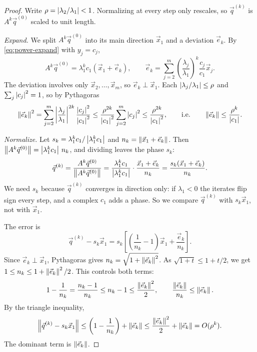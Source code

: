 \begin{proof}
  Write $\rho = \left\lvert \lambda_2/\lambda_1 \right\rvert < 1$. Normalizing at every step only rescales, so $\vec{q}^{(k)}$ is $A^k\vec{q}^{(0)}$ scaled to unit length.

  \emph{Expand.} We split $A^k\vec{q}^{(0)}$ into its main direction $\vec{x}_1$ and a deviation $\vec{e}_k$. By \eqref{eq:power-expand} with $y_j = c_j$,
  \begin{equation*}
    A^k\vec{q}^{(0)} = \lambda_1^kc_1(\vec{x}_1 + \vec{e}_k), \qquad \vec{e}_k = \sum_{j=2}^m\left(\frac{\lambda_j}{\lambda_1}\right)^k\frac{c_j}{c_1}\vec{x}_j.
  \end{equation*}
  The deviation involves only $\vec{x}_2, \dots, \vec{x}_m$, so $\vec{e}_k \perp \vec{x}_1$. Each $\left\lvert \lambda_j/\lambda_1 \right\rvert \le \rho$ and $\sum_j\left\lvert c_j \right\rvert^2 = 1$, so by Pythagoras
  \begin{equation*}
    \left\lVert \vec{e}_k \right\rVert^2 = \sum_{j=2}^m\left\lvert \frac{\lambda_j}{\lambda_1} \right\rvert^{2k}\frac{\left\lvert c_j \right\rvert^2}{\left\lvert c_1 \right\rvert^2} \le \frac{\rho^{2k}}{\left\lvert c_1 \right\rvert^2}\sum_{j=2}^m\left\lvert c_j \right\rvert^2 \le \frac{\rho^{2k}}{\left\lvert c_1 \right\rvert^2}, \qquad\text{i.e.}\qquad \left\lVert \vec{e}_k \right\rVert \le \frac{\rho^k}{\left\lvert c_1 \right\rvert}.
  \end{equation*}

  \emph{Normalize.} Let $s_k = \lambda_1^kc_1/\left\lvert \lambda_1^kc_1 \right\rvert$ and $n_k = \left\lVert \vec{x}_1 + \vec{e}_k \right\rVert$. Then $\left\lVert A^k\vec{q}^{(0)} \right\rVert = \left\lvert \lambda_1^kc_1 \right\rvert\,n_k$, and dividing leaves the phase $s_k$:
  \begin{equation*}
    \vec{q}^{(k)} = \frac{A^k\vec{q}^{(0)}}{\left\lVert A^k\vec{q}^{(0)} \right\rVert} = \frac{\lambda_1^kc_1}{\left\lvert \lambda_1^kc_1 \right\rvert}\cdot\frac{\vec{x}_1 + \vec{e}_k}{n_k} = \frac{s_k(\vec{x}_1 + \vec{e}_k)}{n_k}.
  \end{equation*}
  We need $s_k$ because $\vec{q}^{(k)}$ converges in direction only: if $\lambda_1 < 0$ the iterates flip sign every step, and a complex $c_1$ adds a phase. So we compare $\vec{q}^{(k)}$ with $s_k\vec{x}_1$, not with $\vec{x}_1$.

  The error is
  \begin{equation*}
    \vec{q}^{(k)} - s_k\vec{x}_1 = s_k\left[\left(\frac{1}{n_k} - 1\right)\vec{x}_1 + \frac{\vec{e}_k}{n_k}\right].
  \end{equation*}
  Since $\vec{e}_k \perp \vec{x}_1$, Pythagoras gives $n_k = \sqrt{1 + \left\lVert \vec{e}_k \right\rVert^2}$. As $\sqrt{1 + t} \le 1 + t/2$, we get $1 \le n_k \le 1 + \left\lVert \vec{e}_k \right\rVert^2/2$. This controls both terms:
  \begin{equation*}
    1 - \frac{1}{n_k} = \frac{n_k - 1}{n_k} \le n_k - 1 \le \frac{\left\lVert \vec{e}_k \right\rVert^2}{2}, \qquad \frac{\left\lVert \vec{e}_k \right\rVert}{n_k} \le \left\lVert \vec{e}_k \right\rVert.
  \end{equation*}
  By the triangle inequality,
  \begin{equation*}
    \left\lVert \vec{q}^{(k)} - s_k\vec{x}_1 \right\rVert \le \left(1 - \frac{1}{n_k}\right) + \left\lVert \vec{e}_k \right\rVert \le \frac{\left\lVert \vec{e}_k \right\rVert^2}{2} + \left\lVert \vec{e}_k \right\rVert = O(\rho^k).
  \end{equation*}
  The dominant term is $\left\lVert \vec{e}_k \right\rVert$.


\end{proof}

